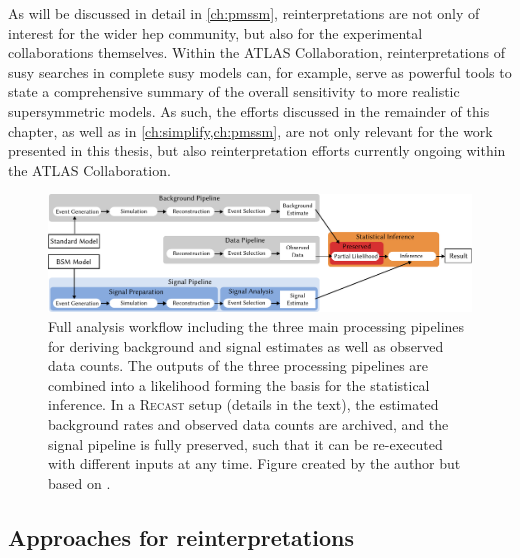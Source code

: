 As will be discussed in detail in \cref{ch:pmssm}, reinterpretations are not only of interest for the wider \gls{hep} community, but also for the experimental collaborations themselves. Within the ATLAS Collaboration, reinterpretations of \gls{susy} searches in complete \gls{susy} models can, for example, serve as powerful tools to state a comprehensive summary of the overall sensitivity to more realistic supersymmetric models. As such, the efforts discussed in the remainder of this chapter, as well as in \cref{ch:simplify,ch:pmssm}, are not only relevant for the work presented in this thesis, but also reinterpretation efforts currently ongoing within the ATLAS Collaboration.
 
 \begin{figure}
	\centering\includegraphics[width=\textwidth]{pipeline}
	\caption{Full analysis workflow including the three main processing pipelines for deriving background and signal estimates as well as observed data counts. The outputs of the three processing pipelines are combined into a likelihood forming the basis for the statistical inference. In a \textsc{Recast} setup (details in the text), the estimated background rates and observed data counts are archived, and the signal pipeline is fully preserved, such that it can be re-executed with different inputs at any time. Figure created by the author but based on \mbox{\cite{ATL-PHYS-PUB-2019-032}}.}
	\label{fig:pipeline_analysis}
\end{figure}

\subsection{Approaches for reinterpretations}


